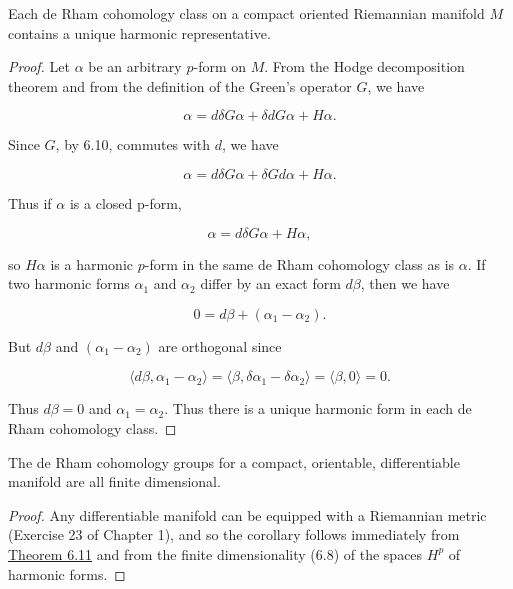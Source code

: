 \begin{theorem}\label{thm:6.11}
Each de Rham cohomology class on a compact oriented Riemannian manifold $M$ contains a unique harmonic representative.

\end{theorem}

\begin{proof}
Let $\alpha$ be an arbitrary $p$-form on $M$. From the Hodge decomposition theorem and from the definition of the Green's operator $G$, we have

\begin{equation}
\tag{1}\label{eq:6.11:1}
\alpha=d\delta G\alpha+\delta d G\alpha+H\alpha.
\end{equation}

Since $G$, by 6.10, commutes with $d$, we have

\begin{equation}
\tag{2}\label{eq:6.11:2}
\alpha=d\delta G\alpha+\delta G d\alpha+H\alpha.
\end{equation}

Thus if  $ \alpha $ is a closed p-form,


\[
\alpha=d\delta G\alpha+H\alpha,
\]

so $H\alpha$ is a harmonic $p$-form in the same de Rham cohomology class as is $\alpha$. If two harmonic forms $\alpha_{1}$ and $\alpha_{2}$ differ by an exact form $d\beta$, then we have

\[
0=d\beta+(\alpha_{1}-\alpha_{2}).
\]

But  $ d\beta $ and  $ (\alpha_{1}-\alpha_{2}) $ are orthogonal since

\[
\langle d\beta,\alpha_{1}-\alpha_{2}\rangle=\langle\beta,\delta\alpha_{1}-\delta\alpha_{2}\rangle=\langle\beta,0\rangle=0.
\]

Thus $d\beta=0$ and $\alpha_{1}=\alpha_{2}$. Thus there is a unique harmonic form in each de Rham cohomology class.

\end{proof}

\begin{corollary*}
The de Rham cohomology groups for a compact, orientable, differentiable manifold are all finite dimensional.
\end{corollary*}

\begin{proof}
Any differentiable manifold can be equipped with a Riemannian metric (Exercise 23 of Chapter 1), and so the corollary follows immediately from \hyperref[thm:6.11]{Theorem 6.11} and from the finite dimensionality (6.8) of the spaces $H^{p}$ of harmonic forms.
\end{proof}

